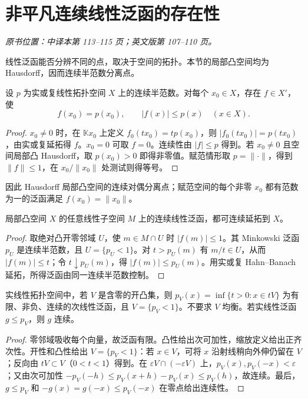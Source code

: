 \section{非平凡连续线性泛函的存在性}\label{sec:yosida-04-06}
\noindent\textit{原书位置：中译本第 113--115 页；英文版第 107--110 页。}

线性泛函能否分辨不同的点，取决于空间的拓扑。本节的局部凸空间均为 Hausdorff，因而连续半范数分离点。

\begin{theorem}[连续半范数的支撑泛函]\label{thm:y4-continuous-support}
设 $p$ 为实或复线性拓扑空间 $X$ 上的连续半范数。对每个 $x_0\in X$，存在 $f\in X'$，使
\[
 f(x_0)=p(x_0),\qquad |f(x)|\le p(x)\quad(x\in X).
\]
\end{theorem}
\begin{proof}
$x_0\ne0$ 时，在 $\mathbb K x_0$ 上定义 $f_0(tx_0)=tp(x_0)$，则 $|f_0(tx_0)|=p(tx_0)$，由实或复延拓得 $f$。$x_0=0$ 可取 $f=0$。连续性由 $|f|\le p$ 得到。若 $x_0\ne0$ 且空间局部凸 Hausdorff，取 $p(x_0)>0$ 即得非零值。赋范情形取 $p=\|\cdot\|$，得到 $\|f\|\le1$，在 $x_0/\|x_0\|$ 处测试则得等号。
\end{proof}

因此 Hausdorff 局部凸空间的连续对偶分离点；赋范空间的每个非零 $x_0$ 都有范数为一的泛函满足 $f(x_0)=\|x_0\|$。

\begin{proposition}[局部凸空间子空间上的连续延拓]\label{prop:y4-lcs-extension}
局部凸空间 $X$ 的任意线性子空间 $M$ 上的连续线性泛函，都可连续延拓到 $X$。
\end{proposition}
\begin{proof}
取绝对凸开零邻域 $U$，使 $m\in M\cap U$ 时 $|f(m)|\le1$。其 Minkowski 泛函 $p_U$ 是连续半范数，且 $U=\{p_U<1\}$。对 $t>p_U(m)$ 有 $m/t\in U$，从而 $|f(m)|\le t$；令 $t\downarrow p_U(m)$，得 $|f(m)|\le p_U(m)$。用实或复 Hahn--Banach 延拓，所得泛函由同一连续半范数控制。
\end{proof}

\begin{lemma}[开凸零邻域的非对称泛函]\label{lem:y4-open-gauge}
实线性拓扑空间中，若 $V$ 是含零的开凸集，则
$p_V(x)=\inf\{t>0:x\in tV\}$ 为有限、非负、连续的次线性泛函，且 $V=\{p_V<1\}$。不要求 $V$ 均衡。若实线性泛函 $g\le p_V$，则 $g$ 连续。
\end{lemma}
\begin{proof}
零邻域吸收每个向量，故泛函有限。凸性给出次可加性，缩放定义给出正齐次性。开性和凸性给出 $V=\{p_V<1\}$：若 $x\in V$，可将 $x$ 沿射线稍向外伸仍留在 $V$；反向由 $tV\subset V$（$0<t<1$）得到。在 $\varepsilon V\cap(-\varepsilon V)$ 上，$p_V(x),p_V(-x)<\varepsilon$；又由次可加性
$-p_V(-h)\le p_V(x+h)-p_V(x)\le p_V(h)$，故连续。最后，$g\le p_V$ 和 $-g(x)=g(-x)\le p_V(-x)$ 在零点给出连续性。
\end{proof}

